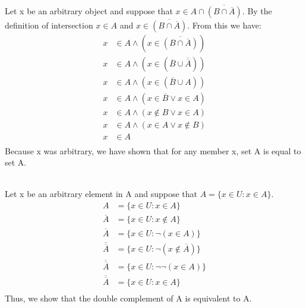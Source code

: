 \documentclass[11pt]{article}
\makeatletter
\def\ol{\overline}
\renewenvironment{proof}[1][\proofname]{\par
  \normalfont \topsep6\p@\@plus6\p@\relax
  \trivlist
  \item[\hskip\labelsep
        \itshape
    #1\@addpunct{.}]\ignorespaces
}{%
  \endtrivlist\@endpefalse
}
\makeatother
\begin{document}
\subsection{} %
\begin{proof}[\textbf{Prove:} $\forall x (x \in A \cap \ol{(B \cap \ol A)} = x \in A)$] \leavevmode \\
	Let x be an arbitrary object and suppose that $x \in A \cap \ol{(B \cap \ol A)}$. By the definition of intersection $x \in A$ and $x \in \ol{(B \cap \ol A)}$. From this we have: 
 	\begin{align*}
 		x &\in A \land (x \in \ol{(B \cap \ol A)}) \\
 		x &\in A \land (x \in (\ol B \cup \ol{\ol A})) \tag*{De Morgan's} \\
		x &\in A \land (x \in (\ol B \cup A)) \tag*{Double Complementarity} \\
		x &\in A \land (x \in \ol B \lor x \in A) \tag*{Definition of Union} \\
		x &\in A \land (x \notin B \lor x \in A) \tag*{Definition of Complement} \\
		x &\in A \land (x \in A \lor x \notin B) \tag*{Commutativity} \\
		x &\in A \tag*{Absorption} \\
 	\end{align*}
	Because x was arbitrary, we have shown that for any member x, set A is equal to set A.
\end{proof}

\begin{proof}[\textbf{Prove:} Double complementarity, that $\ol{\ol A} = A$] \leavevmode \\
	Let x be an arbitrary element in A and suppose that $A = \{x \in U : x \in A\}$.
	\begin{align*}
		A &= \{x \in U : x \in A\} \\
		\ol A &= \{x \in U: x \notin A\} \tag*{Definition of Complement} \\
		\ol A &= \{x \in U: \neg (x \in A)\} \tag*{Definition of Negation} \\
		\ol{\ol A} &= \{x \in U: \neg (x \notin \ol A)\} \tag*{Definition of Complement} \\
		\ol{\ol A} &= \{x \in U: \neg \neg (x \in A)\} \tag*{Definition of Negation} \\
		\ol{\ol A} &= \{x \in U: x \in A\} \tag*{Double Negation} \\
	\end{align*}
	Thus, we show that the double complement of A is equivalent to A.
\end{proof}
\end{document}
